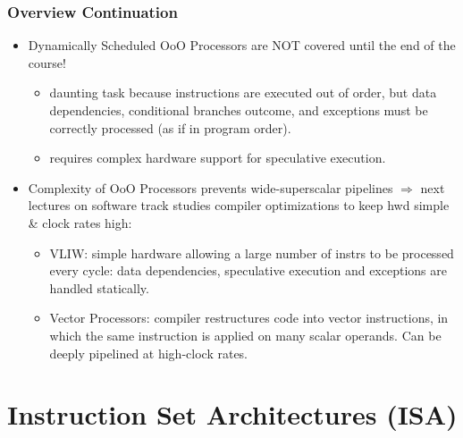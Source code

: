 \documentclass{beamer}
\begin{document}
\begin{frame}[fragile,t]
\frametitle{Overview Continuation}

\begin{itemize}
    \item Dynamically Scheduled OoO Processors are NOT covered until the end of the course!
        \begin{itemize}
            \item daunting task because instructions are
                    executed out of order, but data dependencies, conditional branches outcome,
                    and exceptions must be correctly processed (as if in program order).
            \item requires complex hardware support for speculative execution.
        \end  {itemize}\bigskip

    \item Complexity of OoO Processors prevents wide-superscalar
            pipelines $\Rightarrow$ next lectures on software track studies
            compiler optimizations to keep hwd simple \& clock rates high:
        \begin{itemize}
            \item VLIW: simple hardware allowing a large number of instrs to be     
                        processed every cycle: data dependencies, speculative execution 
                        and exceptions are handled statically. 
            \item Vector Processors: compiler restructures code into vector instructions,
                    in which the same instruction is applied on many scalar operands.
                    Can be deeply pipelined at high-clock rates. 
        \end  {itemize}\bigskip
\end  {itemize}

\end{frame}

\section{Instruction Set Architectures (ISA)}

\begin{frame}[fragile]
	\tableofcontents[currentsection]
\end{frame}
\end{document}
